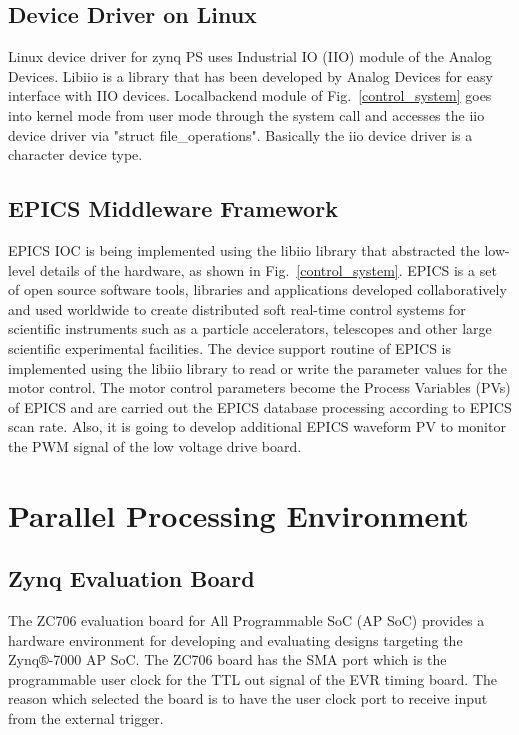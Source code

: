 \documentclass[journal]{IEEEtran}
\begin{document}
\subsection{Device Driver on Linux}
Linux device driver for zynq PS uses Industrial IO (IIO) module of the Analog Devices. Libiio\cite{iio} is a library that has been developed by Analog Devices for easy interface with IIO devices. Localbackend module of Fig.~\ref{control_system} goes into kernel mode from user mode through the system call and accesses the iio device driver via "struct file\_operations". Basically the iio device driver is a character device type.

\subsection{EPICS Middleware Framework}
EPICS IOC is being implemented using the libiio library that abstracted the low-level details of the hardware, as shown in Fig.~\ref{control_system}. EPICS is a set of open source software tools, libraries and applications developed collaboratively and used worldwide to create distributed soft real-time control systems for scientific instruments such as a particle accelerators, telescopes and other large scientific experimental facilities\cite{epics}. The device support routine of EPICS is implemented using the libiio library to read or write the parameter values for the motor control. The motor control parameters become the Process Variables (PVs) of EPICS and are carried out the EPICS database processing according to EPICS scan rate. Also, it is going to develop additional EPICS waveform PV to monitor the PWM signal of the low voltage drive board.


\section{Parallel Processing Environment}
\subsection{Zynq Evaluation Board}
The ZC706 evaluation board for All Programmable SoC (AP SoC) provides a hardware environment for developing and evaluating designs targeting the Zynq®-7000 AP SoC.\cite{zc706-doc} The ZC706 board has the SMA port which is the programmable user clock for the TTL out signal of the EVR timing board. The reason which selected the board is to have the user clock port to receive input from the external trigger.
\end{document}

